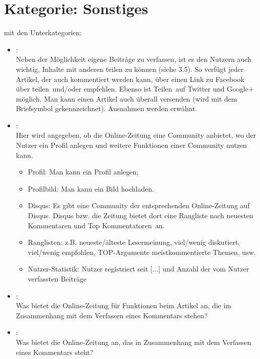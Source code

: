 \section{Kategorie: \glqq Sonstiges\grqq} 

mit den Unterkategorien:
\begin{itemize}
\item{}\grqq:\\
Neben der Möglichkeit eigene Beiträge zu verfassen, ist es den Nutzern auch wichtig, 
Inhalte mit anderen teilen zu können (siehe 3.5). So verfügt jeder Artikel, der auch
kommentiert werden kann, über einen Link zu Facebook über \glqq teilen\grqq\ und/oder \glqq empfehlen\grqq.
Ebenso ist \glqq Teilen\grqq\ auf Twitter und Google+ möglich. Man kann einen Artikel auch überall
versenden (wird mit dem Briefsymbol gekennzeichnet). Ausnahmen werden erwähnt. 



\item{}\grqq: \\
Hier wird angegeben, ob die Online-Zeitung eine Community anbietet, wo der Nutzer ein Profil 
anlegen und weitere Funktionen einer Community nutzen kann. 
\begin{itemize}
\item Profil: Man kann ein Profil anlegen; 
\item Profilbild: Man kann ein Bild hochladen.
\item Disqus: Es gibt eine Community der entsprechenden Online-Zeitung auf Disqus. Disqus bzw. 
die Zeitung bietet dort eine Rangliste nach \glqq neuesten Kommentaren\grqq\- und  \glqq Top 
Kommentatoren\grqq\ an. 
\item Ranglisten: z.B. neueste/älteste Lesermeinung, viel/wenig diskutiert, viel/wenig empfohlen, 
TOP-Argumente meistkommentierte Themen, usw. 
\item Nutzer-Statistik: Nutzer registriert seit [...] und Anzahl der vom Nutzer verfassten Beiträge
\end{itemize}

\item{}\grqq:\\
Was bietet die Online-Zeitung für Funktionen beim Artikel an, die im Zusammenhang 
mit dem Verfassen eines Kommentars stehen?


\item{}\grqq:\\
Was bietet die Online-Zeitung an, das in Zusammenhang mit dem Verfassen eines Kommentars steht?

\end{itemize}







